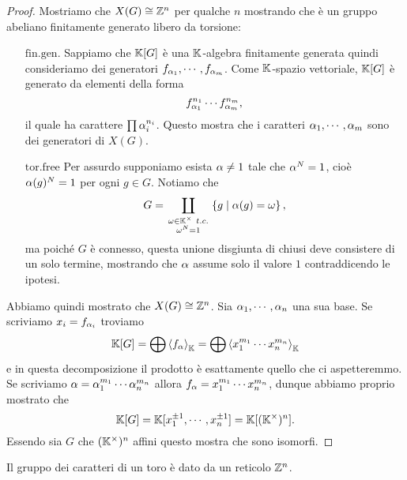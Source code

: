 \begin{proof}
Mostriamo che $X(G)\cong \mathbb{Z}^n$ per qualche $n$ mostrando che \`e un gruppo abeliano finitamente generato libero da torsione:
\setlength{\leftmargini}{0cm}
\begin{itemize}
\item[$\boxed{\text{fin.gen.}}$] Sappiamo che $\mathbb{K}[G]$ \`e una $\mathbb{K}$-algebra finitamente generata quindi consideriamo dei generatori $f_{\alpha_1},\cdots, f_{\alpha_m}$. Come $\mathbb{K}$-spazio vettoriale, $\mathbb{K}[G]$ \`e generato da elementi della forma
\[f_{\alpha_1}^{n_1}\cdots f_{\alpha_m}^{n_m},\]
il quale ha carattere $\prod \alpha_i^{n_i}$. Questo mostra che i caratteri $\alpha_1,\cdots, \alpha_m$ sono dei generatori di $X(G)$.
\item[$\boxed{\text{tor.free}}$] Per assurdo supponiamo esista $\alpha\neq 1$ tale che $\alpha^N=1$, cio\`e $\alpha(g)^N=1$ per ogni $g\in G$. Notiamo che
\[G=\coprod_{\begin{smallmatrix}\omega\in \mathbb{K}^\times\ t.c.\\ \omega^N=1\end{smallmatrix}}\left\{ g\mid \alpha(g)=\omega\right\},\]
ma poich\'e $G$ \`e connesso, questa unione disgiunta di chiusi deve consistere di un solo termine, mostrando che $\alpha$ assume solo il valore $1$ contraddicendo le ipotesi.
\end{itemize}
\setlength{\leftmargini}{0.5cm}
\medskip

Abbiamo quindi mostrato che $X(G)\cong \mathbb{Z}^n$. Sia $\alpha_1,\cdots, \alpha_n$ una sua base. Se scriviamo $x_i=f_{\alpha_i}$ troviamo
\[\mathbb{K}[G]=\bigoplus \left\langle {f_\alpha}\right\rangle_{\mathbb{K}}=\bigoplus \left\langle {x_1^{m_1}\cdots x_n^{m_n}}\right\rangle_{\mathbb{K}}\]
e in questa decomposizione il prodotto \`e esattamente quello che ci aspetteremmo.
Se scriviamo $\alpha=\alpha_1^{m_1}\cdots\alpha_n^{m_n}$ allora $f_\alpha=x_1^{m_1}\cdots x_n^{m_n}$, dunque abbiamo proprio mostrato che
\[\mathbb{K}[G]=\mathbb{K}[x_1^{\pm1},\cdots, x_n^{\pm 1}]=\mathbb{K}[(\mathbb{K}^\times)^n].\]
Essendo sia $G$ che $(\mathbb{K}^\times)^n$ affini questo mostra che sono isomorfi.
\end{proof}

\begin{remark}
Il gruppo dei caratteri di un toro \`e dato da un reticolo $\mathbb{Z}^n$.
\end{remark}

